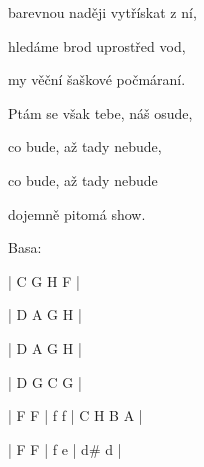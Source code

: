 barevnou naději vytřískat z ní,

hledáme brod uprostřed vod,

my věční šaškové počmáraní.
\kr

\zs
Ptám se však tebe, náš osude,

co bude, až tady nebude,

co bude, až tady nebude

dojemně pitomá show.
\ks

\ifdefined\TPBAND
 Basa:
 
 | C G H F |
 
 | D A G H |
 
 | D A G H |
 
 | D G C G | 
 
 \zr
 | F F | f f | C H B A |
 
 | F F | f e | d\# d |
 \kr
\fi

\kp
